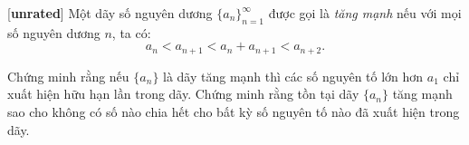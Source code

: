 \documentclass[../02-modular-arithmetic-b.tex]{subfiles}
\begin{document}
\begin{exercise*}\label{example:JPN-2015-MO-P3}[\textbf{unrated}]
	Một dãy số nguyên dương \( \{a_n\}_{n=1}^{\infty} \) được gọi là \textit{tăng mạnh} nếu với mọi số nguyên dương \( n \), ta có:
	\[
		a_n < a_{n+1} < a_n + a_{n+1} < a_{n+2}.
	\]
	
	\begin{enumerate}[topsep=0pt, partopsep=0pt, itemsep=0pt, label=(\alph*)]
		\ii Chứng minh rằng nếu \( \{a_n\} \) là dãy tăng mạnh thì các số nguyên tố lớn hơn \( a_1 \) chỉ xuất hiện hữu hạn lần trong dãy.
		\ii Chứng minh rằng tồn tại dãy \( \{a_n\} \) tăng mạnh sao cho không có số nào chia hết cho bất kỳ số nguyên tố nào đã xuất hiện trong dãy.
	\end{enumerate}
\end{exercise*}
\end{document}
